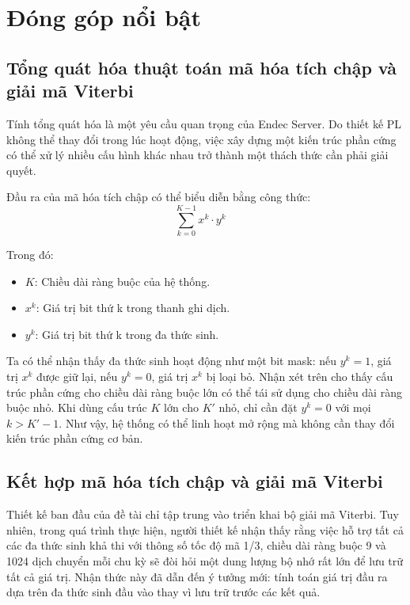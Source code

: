 \documentclass[../DoAn.tex]{subfiles}
\begin{document}
\section{Đóng góp nổi bật}

\subsection{Tổng quát hóa thuật toán mã hóa tích chập và giải mã Viterbi}

Tính tổng quát hóa là một yêu cầu quan trọng của Endec Server. Do thiết kế PL không thể thay đổi trong lúc hoạt động, việc xây dựng một kiến trúc phần cứng có thể xử lý nhiều cấu hình khác nhau trở thành một thách thức cần phải giải quyết.  
 
Đầu ra của mã hóa tích chập có thể biểu diễn bằng công thức:  
\[
\sum_{k=0}^{K-1} x^k \cdot y^k \quad
\]  

Trong đó:
\begin{itemize}
    \item $K$: Chiều dài ràng buộc của hệ thống.
    \item $x^k$: Giá trị bit thứ k trong thanh ghi dịch.
    \item $y^k$: Giá trị bit thứ k trong đa thức sinh.
\end{itemize}  

Ta có thể nhận thấy đa thức sinh hoạt động như một bit mask: nếu $y^k = 1$, giá trị $x^k$ được giữ lại, nếu $y^k = 0$, giá trị $x^k$ bị loại bỏ. Nhận xét trên cho thấy cấu trúc phần cứng cho chiều dài ràng buộc lớn có thể tái sử dụng cho chiều dài ràng buộc nhỏ. Khi dùng cấu trúc $K$ lớn cho $K'$ nhỏ, chỉ cần đặt $y^k = 0$ với mọi $k > K' - 1$. Như vậy, hệ thống có thể linh hoạt mở rộng mà không cần thay đổi kiến trúc phần cứng cơ bản. 

\subsection{Kết hợp mã hóa tích chập và giải mã Viterbi}
\label{section:Kết hợp mã hóa tích chập và giải mã Viterbi}

Thiết kế ban đầu của đề tài chỉ tập trung vào triển khai bộ giải mã Viterbi. Tuy nhiên, trong quá trình thực hiện, người thiết kế nhận thấy rằng việc hỗ trợ tất cả các đa thức sinh khả thi với thông số tốc độ mã 1/3, chiều dài ràng buộc 9 và 1024 dịch chuyển mỗi chu kỳ sẽ đòi hỏi một dung lượng bộ nhớ rất lớn để lưu trữ tất cả giá trị. Nhận thức này đã dẫn đến ý tưởng mới: tính toán giá trị đầu ra dựa trên đa thức sinh đầu vào thay vì lưu trữ trước các kết quả.
\end{document}
